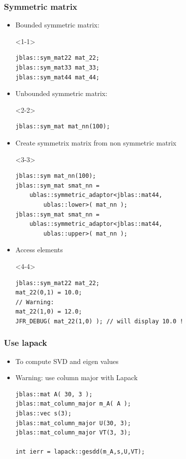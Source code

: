 \documentclass[compress]{beamer}
\begin{document}

\begin{frame}[fragile]
  \frametitle{Symmetric matrix}
  \begin{itemize}
   \item<1-> Bounded symmetric matrix:
    \begin{onlyenv}<1-1>
      \begin{lstlisting}
jblas::sym_mat22 mat_22;
jblas::sym_mat33 mat_33;
jblas::sym_mat44 mat_44;
      \end{lstlisting}
    \end{onlyenv}
   \item<2-> Unbounded symmetric matrix:
    \begin{onlyenv}<2-2>
      \begin{lstlisting}
jblas::sym_mat mat_nn(100);
      \end{lstlisting}
    \end{onlyenv}
   \item<3-> Create symmetrix matrix from non symmetric matrix
    \begin{onlyenv}<3-3>
      \begin{lstlisting}
jblas::sym mat_nn(100);
jblas::sym_mat smat_nn =
    ublas::symmetric_adaptor<jblas::mat44,
        ublas::lower>( mat_nn );
jblas::sym_mat smat_nn =
    ublas::symmetric_adaptor<jblas::mat44,
        ublas::upper>( mat_nn );
      \end{lstlisting}
    \end{onlyenv}
   \item<4-> Access elements
    \begin{onlyenv}<4-4>
      \begin{lstlisting}
jblas::sym_mat22 mat_22;
mat_22(0,1) = 10.0;
// Warning:
mat_22(1,0) = 12.0;
JFR_DEBUG( mat_22(1,0) ); // will display 10.0 !
      \end{lstlisting}
    \end{onlyenv}
  \end{itemize}

\end{frame}


\begin{frame}[fragile]
  \frametitle{Use lapack}
  \begin{itemize}
   \item<1-> To compute SVD and eigen values
   \item<2-> Warning: use column major with Lapack
      \begin{lstlisting}
jblas::mat A( 30, 3 );
jblas::mat_column_major m_A( A );
jblas::vec s(3);
jblas::mat_column_major U(30, 3);
jblas::mat_column_major VT(3, 3);

int ierr = lapack::gesdd(m_A,s,U,VT);
      \end{lstlisting}
  \end{itemize}
\end{frame}
\end{document}
